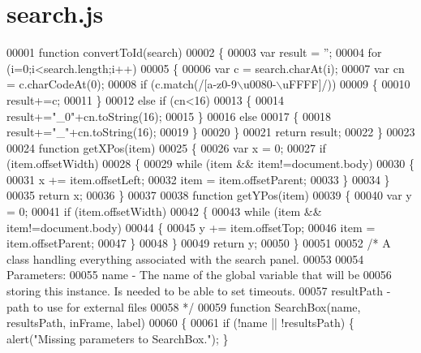\hypertarget{search_8js_source}{}\section{search.\+js}
\label{search_8js_source}

\begin{DoxyCode}
00001 \textcolor{keyword}{function} convertToId(search)
00002 \{
00003   var result = \textcolor{stringliteral}{''};
00004   \textcolor{keywordflow}{for} (i=0;i<search.length;i++)
00005   \{
00006     var c = search.charAt(i);
00007     var cn = c.charCodeAt(0);
00008     \textcolor{keywordflow}{if} (c.match(/[a-z0-9\(\backslash\)u0080-\(\backslash\)uFFFF]/))
00009     \{
00010       result+=c;
00011     \}
00012     \textcolor{keywordflow}{else} \textcolor{keywordflow}{if} (cn<16)
00013     \{
00014       result+=\textcolor{stringliteral}{"\_0"}+cn.toString(16);
00015     \}
00016     \textcolor{keywordflow}{else}
00017     \{
00018       result+=\textcolor{stringliteral}{"\_"}+cn.toString(16);
00019     \}
00020   \}
00021   \textcolor{keywordflow}{return} result;
00022 \}
00023 
00024 \textcolor{keyword}{function} getXPos(item)
00025 \{
00026   var x = 0;
00027   \textcolor{keywordflow}{if} (item.offsetWidth)
00028   \{
00029     \textcolor{keywordflow}{while} (item && item!=document.body)
00030     \{
00031       x   += item.offsetLeft;
00032       item = item.offsetParent;
00033     \}
00034   \}
00035   \textcolor{keywordflow}{return} x;
00036 \}
00037 
00038 \textcolor{keyword}{function} getYPos(item)
00039 \{
00040   var y = 0;
00041   \textcolor{keywordflow}{if} (item.offsetWidth)
00042   \{
00043      \textcolor{keywordflow}{while} (item && item!=document.body)
00044      \{
00045        y   += item.offsetTop;
00046        item = item.offsetParent;
00047      \}
00048   \}
00049   \textcolor{keywordflow}{return} y;
00050 \}
00051 
00052 \textcolor{comment}{/* A class handling everything associated with the search panel.}
00053 \textcolor{comment}{}
00054 \textcolor{comment}{   Parameters:}
00055 \textcolor{comment}{   name - The name of the global variable that will be}
00056 \textcolor{comment}{          storing this instance.  Is needed to be able to set timeouts.}
00057 \textcolor{comment}{   resultPath - path to use for external files}
00058 \textcolor{comment}{*/}
00059 \textcolor{keyword}{function} SearchBox(name, resultsPath, inFrame, label)
00060 \{
00061   \textcolor{keywordflow}{if} (!name || !resultsPath) \{  alert(\textcolor{stringliteral}{"Missing parameters to SearchBox."}); \}

\end{DoxyCode}
